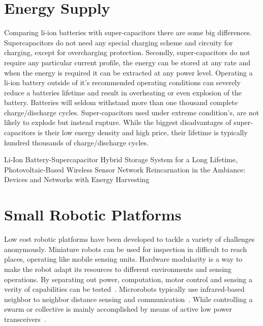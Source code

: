 \section{Energy Supply}
\label{sec:energy_supply}


Comparing li-ion batteries with super-capacitors there are some big differences.
Supercapacitors do not need any special charging scheme and circuity for charging, except for overcharging protection.
Secondly, super-capacitors do not require any particular current profile, the energy can be stored at any rate and when the energy is required it can be extracted at any power level.
Operating a li-ion battery outside of it's recommended operating conditions can severely reduce a batteries lifetime and result in overheating or even explosion of the battery.
Batteries will seldom withstand more than one thousand complete charge/discharge cycles.
Super-capacitors used under extreme condition's, are not likely to explode but instead rupture.
While the biggest disadvantages of super-capacitors is their low energy density and high price, their lifetime is typically hundred thousands of charge/discharge cycles.

Li-Ion Battery-Supercapacitor Hybrid Storage System for a Long Lifetime, Photovoltaic-Based Wireless Sensor Network	\cite{ongaro_pwre_2012}
Reincarnation in the Ambiance: Devices and Networks with Energy Harvesting \cite{prasad_comst_2014}



\section{Small Robotic Platforms}
\label{sec:robotic_platforms}

% 

Low cost robotic platforms have been developed to tackle a variety of challenges anonymously.
Miniature robots can be used for inspection in difficult to reach places, operating like mobile sensing units.
Hardware modularity is a way to make the robot adapt its resources to different environments and sensing operations.
By separating out power, computation, motor control and sensing a verity of capabilities can be tested~\cite{sabelhaus_icra_2013, pickem_icra_2015, kim_iros_2016}.
Microrobots typically use infrared-based neighbor to neighbor distance sensing and communication~\cite{rubenstein_icra_2012, pickem_icra_2015, kim_iros_2016}.
While controlling a swarm or collective is mainly accomplished by means of active low power transceivers~\cite{sabelhaus_icra_2013, pickem_icra_2015, kim_iros_2016}. 

